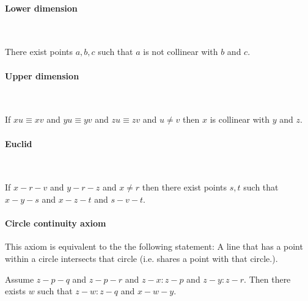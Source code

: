 \documentclass{article}
\newcommand{\Cong}[4]{#1 #2 \equiv #3 #4}
\begin{document}
  \paragraph{Lower dimension}\

  \begin{forthel}
    \begin{axiom}[A8]
      There exist points $a,b,c$ such that
      $a$ is not collinear with $b$ and $c$.
    \end{axiom}
  \end{forthel}


  \paragraph{Upper dimension}\

  \begin{forthel}
    \begin{axiom}[A9]
      If $\Cong{x}{u}{x}{v}$ and $\Cong{y}{u}{y}{v}$
      and $\Cong{z}{u}{z}{v}$ and $u \neq v$
      then $x$ is collinear with $y$ and $z$.
    \end{axiom}
  \end{forthel}


  \paragraph{Euclid}\

  \begin{forthel}
    \begin{axiom}[A10]
      If $x-r-v$ and $y-r-z$ and $x \neq r$ then there exist points $s,t$ such that $x-y-s$ and $x-z-t$ and $s-v-t$.
    \end{axiom}
  \end{forthel}


  \paragraph{Circle continuity axiom} This axiom is equivalent to the the following statement: A line that has a point within a circle intersects that circle (i.e. shares a point with that circle.).

  \begin{forthel}
    \begin{axiom}[CA]
      Assume $z-p-q$ and $z-p-r$ and $z-x : z-p$ and $z-y : z-r$. Then there exists $w$ such that $z-w : z-q$ and $x-w-y$.
    \end{axiom}
  \end{forthel}
\end{document}
